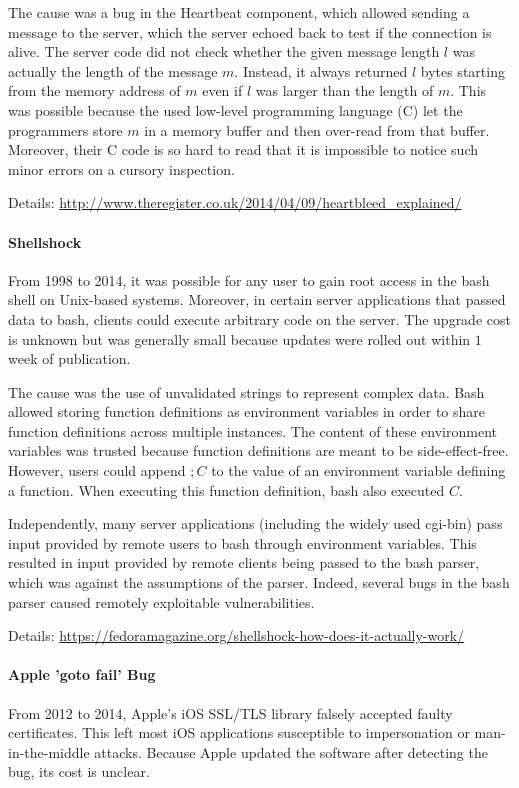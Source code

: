The cause was a bug in the Heartbeat component, which allowed sending a message to the server, which the server echoed back to test if the connection is alive.
The server code did not check whether the given message length $l$ was actually the length of the message $m$.
Instead, it always returned $l$ bytes starting from the memory address of $m$ even if $l$ was larger than the length of $m$.
This was possible because the used low-level programming language (C) let the programmers store $m$ in a memory buffer and then over-read from that buffer.
Moreover, their C code is so hard to read that it is impossible to notice such minor errors on a cursory inspection.

Details: \url{http://www.theregister.co.uk/2014/04/09/heartbleed_explained/}

\paragraph{Shellshock}
From 1998 to 2014, it was possible for any user to gain root access in the bash shell on Unix-based systems.
Moreover, in certain server applications that passed data to bash, clients could execute arbitrary code on the server.
The upgrade cost is unknown but was generally small because updates were rolled out within $1$ week of publication.

The cause was the use of unvalidated strings to represent complex data.
Bash allowed storing function definitions as environment variables in order to share function definitions across multiple instances.
The content of these environment variables was trusted because function definitions are meant to be side-effect-free.
However, users could append $; C$ to the value of an environment variable defining a function.
When executing this function definition, bash also executed $C$.


Independently, many server applications (including the widely used cgi-bin) pass input provided by remote users to bash through environment variables.
This resulted in input provided by remote clients being passed to the bash parser, which was against the assumptions of the parser.
Indeed, several bugs in the bash parser caused remotely exploitable vulnerabilities.

Details: \url{https://fedoramagazine.org/shellshock-how-does-it-actually-work/}

\paragraph{Apple 'goto fail' Bug}
From 2012 to 2014, Apple's iOS SSL/TLS library falsely accepted faulty certificates.
This left most iOS applications susceptible to impersonation or man-in-the-middle attacks.
Because Apple updated the software after detecting the bug, its cost is unclear.

